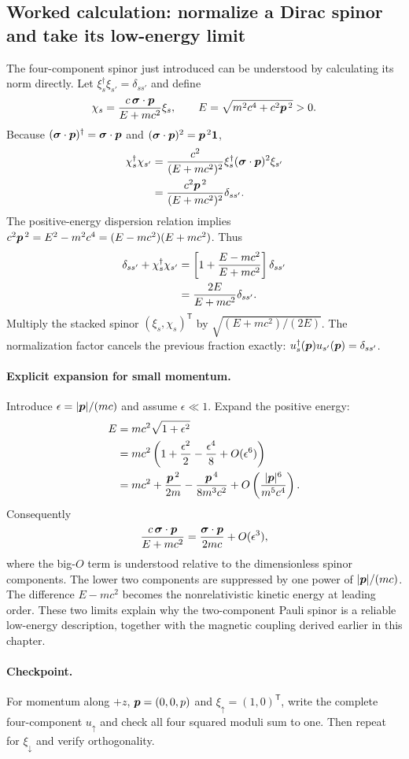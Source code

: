 \subsection*{Worked calculation: normalize a Dirac spinor and take its low-energy limit}
The four-component spinor just introduced can be understood
by calculating its norm directly. Let
$\xi_s^\dagger\xi_{s'}=\delta_{ss'}$ and define
\begin{equation}
\chi_s=\frac{c\,\bm{\sigma}\cdot\bm{p}}{E+mc^2}\xi_s,
\qquad E=\sqrt{m^2c^4+c^2\bm{p}^{\,2}}>0.
\end{equation}
Because $(\bm{\sigma}\cdot\bm{p})^\dagger
=\bm{\sigma}\cdot\bm{p}$ and
$(\bm{\sigma}\cdot\bm{p})^2=\bm{p}^{\,2}\mathbf1$,
\begin{align}
\chi_s^\dagger\chi_{s'}
&=\frac{c^2}{(E+mc^2)^2}
 \xi_s^\dagger(\bm{\sigma}\cdot\bm{p})^2\xi_{s'}\notag\\
&=\frac{c^2\bm{p}^{\,2}}{(E+mc^2)^2}\delta_{ss'}.
\end{align}
The positive-energy dispersion relation implies
$c^2\bm{p}^{\,2}=E^2-m^2c^4
=(E-mc^2)(E+mc^2)$.
Thus
\begin{align}
\delta_{ss'}+\chi_s^\dagger\chi_{s'}
&=\left[1+\frac{E-mc^2}{E+mc^2}\right]\delta_{ss'}\notag\\
&=\frac{2E}{E+mc^2}\delta_{ss'}.
\end{align}
Multiply the stacked spinor $(\xi_s,\chi_s)^{\mathsf T}$
by $\sqrt{(E+mc^2)/(2E)}$. The normalization factor
cancels the previous fraction exactly:
$u_s^\dagger(\bm{p})u_{s'}(\bm{p})=\delta_{ss'}$.

\paragraph{Explicit expansion for small momentum.}
Introduce $\epsilon=|\bm{p}|/(mc)$ and assume
$\epsilon\ll1$. Expand the positive energy:
\begin{align}
E&=mc^2\sqrt{1+\epsilon^2}\notag\\
 &=mc^2\left(1+\frac{\epsilon^2}{2}
   -\frac{\epsilon^4}{8}+O(\epsilon^6)\right)\notag\\
 &=mc^2+\frac{\bm{p}^{\,2}}{2m}
   -\frac{\bm{p}^{\,4}}{8m^3c^2}
   +O\left(\frac{|\bm{p}|^6}{m^5c^4}\right).
\end{align}
Consequently
\begin{equation}
\frac{c\,\bm{\sigma}\cdot\bm{p}}{E+mc^2}
=\frac{\bm{\sigma}\cdot\bm{p}}{2mc}
+O(\epsilon^3),
\end{equation}
where the big-$O$ term is understood relative to the
dimensionless spinor components. The lower two components
are suppressed by one power of $|\bm{p}|/(mc)$.
The difference $E-mc^2$ becomes the nonrelativistic kinetic
energy at leading order. These two limits explain why
the two-component Pauli spinor is a reliable low-energy
description, together with the magnetic coupling derived
earlier in this chapter.

\paragraph{Checkpoint.}
For momentum along $+z$,
$\bm{p}=(0,0,p)$ and $\xi_\uparrow=(1,0)^{\mathsf T}$,
write the complete four-component $u_\uparrow$
and check all four squared moduli sum to one.
Then repeat for $\xi_\downarrow$ and verify orthogonality.
